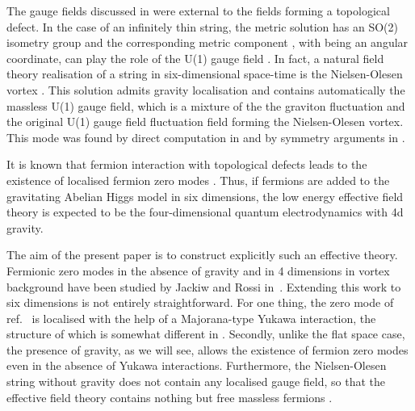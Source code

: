 \documentclass[a4paper,12pt]{article}
\begin{document}
The gauge fields discussed in \cite{Oda:2000zc,Dubovsky:2000av} were
external to the fields forming a topological defect. In the case of
an infinitely thin string, the metric solution has an SO(2) isometry
group and the corresponding metric component \coordHE{}, with
\myHighlight{$\theta$}\coordHE{} being an angular coordinate, can play the role of the U(1)
gauge field \cite{Neronov:2001br}. In fact, a natural field theory
realisation of a string in six-dimensional space-time is the
Nielsen-Olesen  vortex \cite{Nielsen:qs}. This solution admits
gravity localisation \cite{Giovannini:2001hh} and contains
automatically the massless U(1) gauge field, which is  a mixture of
the the graviton  fluctuation \coordHE{} and the original U(1)
gauge field fluctuation \coordHE{} field forming the Nielsen-Olesen
vortex.  This mode was found by direct computation in 
\cite{Giovannini:2002sb,Giovannini:2002mk} and by symmetry arguments
in \cite{Randjbar-Daemi:2002pq}. 

It is known that fermion interaction with topological defects leads
to the existence of localised fermion zero modes
\cite{Jackiw:1975fn,Jackiw:1981ee}. Thus, if fermions are added to
the gravitating Abelian Higgs model in six dimensions, the low energy
effective field theory is expected to be the four-dimensional quantum
electrodynamics with 4d gravity.

The aim of the present paper is to construct explicitly such an
effective theory. Fermionic zero modes in the absence of gravity and
in 4 dimensions in vortex background have been studied by Jackiw and
Rossi in~\cite{Jackiw:1981ee}. Extending this work to six dimensions
is not entirely straightforward. For one thing, the zero mode of
ref.~\cite{Jackiw:1981ee} is localised with the help of a
Majorana-type Yukawa interaction, the structure of which is somewhat
different in \coordHE{}. Secondly, unlike the flat space case, the
presence of gravity, as we will see, allows the existence of fermion
zero modes even in the absence of Yukawa interactions.  Furthermore,
the Nielsen-Olesen string without gravity does not contain any
localised gauge field, so that the effective field theory contains
nothing but free massless fermions \cite{Hughes:fa}. 
\end{document}
